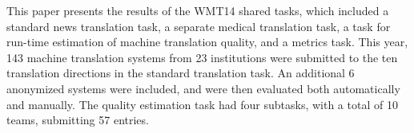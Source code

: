 This paper presents the results of the WMT14 shared tasks, which included a standard news translation task, a separate medical translation task, a task for run-time estimation of machine translation quality, and a metrics task. This year, 143 machine translation systems from 23 institutions were submitted to the ten translation directions in the standard translation task. An additional 6 anonymized systems were included, and were then evaluated both automatically and manually. The quality estimation task had four subtasks, with a total of 10 teams, submitting 57 entries.
